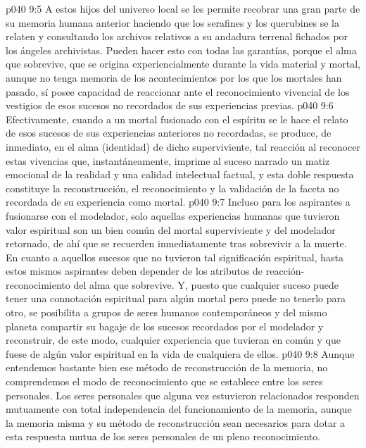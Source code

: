 \vs p040 9:5 A estos hijos del universo local se les permite recobrar una gran parte de su memoria humana anterior haciendo que los serafines y los querubines se la relaten y consultando los archivos relativos a su andadura terrenal fichados por los ángeles archivistas. Pueden hacer esto con todas las garantías, porque el alma que sobrevive, que se origina experiencialmente durante la vida material y mortal, aunque no tenga memoria de los acontecimientos por los que los mortales han pasado, sí posee capacidad de reaccionar ante el reconocimiento vivencial de los vestigios de esos sucesos no recordados de sus experiencias previas.
\vs p040 9:6 Efectivamente, cuando a un mortal fusionado con el espíritu se le hace el relato de esos sucesos de sus experiencias anteriores no recordadas, se produce, de inmediato, en el alma (identidad) de dicho superviviente, tal reacción al reconocer estas vivencias que, instantáneamente, imprime al suceso narrado un matiz emocional de la realidad y una calidad intelectual factual, y esta doble respuesta constituye la reconstrucción, el reconocimiento y la validación de la faceta no recordada de su experiencia como mortal.
\vs p040 9:7 Incluso para los aspirantes a fusionarse con el modelador, solo aquellas experiencias humanas que tuvieron valor espiritual son un bien común del mortal superviviente y del modelador retornado, de ahí que se recuerden inmediatamente tras sobrevivir a la muerte. En cuanto a aquellos sucesos que no tuvieron tal significación espiritual, hasta estos mismos aspirantes deben depender de los atributos de reacción\hyp{}reconocimiento del alma que sobrevive. Y, puesto que cualquier suceso puede tener una connotación espiritual para algún mortal pero puede no tenerlo para otro, se posibilita a grupos de seres humanos contemporáneos y del mismo planeta compartir su bagaje de los sucesos recordados por el modelador y reconstruir, de este modo, cualquier experiencia que tuvieran en común y que fuese de algún valor espiritual en la vida de cualquiera de ellos.
\vs p040 9:8 \pc Aunque entendemos bastante bien ese método de reconstrucción de la memoria, no comprendemos el modo de reconocimiento que se establece entre los seres personales. Los seres personales que alguna vez estuvieron relacionados responden mutuamente con total independencia del funcionamiento de la memoria, aunque la memoria misma y su método de reconstrucción sean necesarios para dotar a esta respuesta mutua de los seres personales de un pleno reconocimiento.
